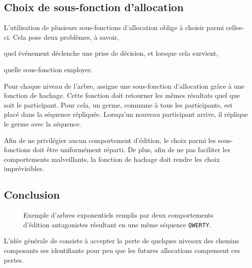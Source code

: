 \subsection{Choix de sous-fonction d'allocation}
\label{repl:subsec:allocationchoice}

L'utilisation de plusieurs sous-fonctions d'allocation oblige à choisir parmi
celles-ci. Cela pose deux problèmes, à savoir,
\begin{inparaenum}[(i)]
\item quel événement déclenche une prise de décision, et lorsque cela survient, 
\item quelle sous-fonction employer.
\end{inparaenum}

Pour chaque niveau de l'arbre, \LSEQ assigne une sous-fonction d'allocation
grâce à une fonction de hachage. Cette fonction doit retourner les mêmes
résultats quel que soit le participant. Pour cela, un germe, commune à tous les
participants, est placé dans la séquence répliquée. Lorsqu'un nouveau
participant arrive, il réplique le germe avec la séquence.

Afin de ne privilégier aucun comportement d'édition, le choix parmi les
sous-fonctions doit être uniformément réparti. De plus, afin de ne pas faciliter
les comportements malveillants, la fonction de hachage doit rendre les choix
imprévisibles.

\subsection{Conclusion}

\begin{figure}
  \begin{center}
    \caption[Gestion des comportements d'édition par \LSEQ]
    {\label{repl:fig:lseqtreeexample} Exemple d'arbres exponentiels \LSEQ
      remplis par deux comportements d'édition antagonistes résultant en une
      même séquence \texttt{QWERTY}.}
  \end{center}
\end{figure}

L'idée générale de \LSEQ consiste à accepter la perte de quelques niveaux des
chemins composants ses identifiants pour peu que les futures allocations
compensent ces pertes.


